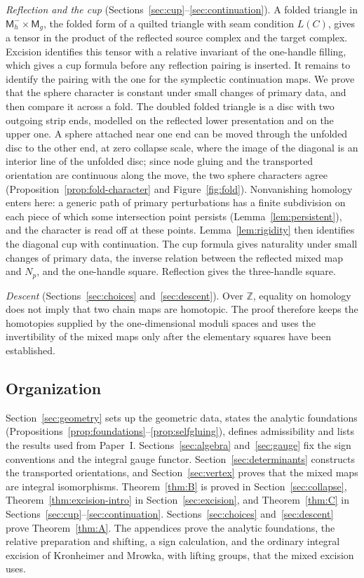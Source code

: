 \documentclass[11pt]{amsart}
\theoremstyle{definition}
\theoremstyle{remark}
\theoremstyle{plain}
\numberwithin{equation}{section}
\newcommand{\ZZ}{\mathbb Z}
\newcommand{\Msf}{\mathsf M}
\begin{document}
\emph{Reflection and the cup} (Sections~\ref{sec:cup}--\ref{sec:continuation}). A folded triangle
in $\Msf_h^-\times\Msf_g$, the folded form of a quilted triangle with seam condition $L(C)$, gives a
tensor in the product of the reflected source complex and the target complex. Excision identifies this tensor with a
relative invariant of the one-handle filling, which gives a cup formula before any reflection pairing is inserted. It remains
to identify the pairing with the one for the symplectic continuation maps. We prove that the sphere character is constant under small changes of primary data, and then compare it across a fold. The doubled folded triangle is a disc with two outgoing strip ends, modelled on the reflected lower presentation and on the upper one. A sphere attached near one end can be moved through the unfolded disc to the other end, at zero collapse scale, where the image of the diagonal is an interior line of the unfolded disc; since node gluing and the transported orientation are continuous along the move, the two sphere characters agree (Proposition~\ref{prop:fold-character} and Figure~\ref{fig:fold}).
Nonvanishing homology enters here: a generic path of primary perturbations has a finite subdivision
on each piece of which some intersection point persists (Lemma~\ref{lem:persistent}), and the
character is read off at these points. Lemma~\ref{lem:rigidity} then identifies the diagonal cup with
continuation. The cup formula gives naturality under small changes of primary data, the inverse
relation between the reflected mixed map and $N_p$, and the one-handle square. Reflection gives the
three-handle square.

\emph{Descent} (Sections~\ref{sec:choices} and~\ref{sec:descent}). Over $\ZZ$, equality on homology
does not imply that two chain maps are homotopic. The proof therefore keeps the homotopies supplied
by the one-dimensional moduli spaces and uses the invertibility of the mixed maps only after the
elementary squares have been established.

\subsection{Organization}
Section~\ref{sec:geometry} sets up the geometric data, states the analytic foundations
(Propositions~\ref{prop:foundations}--\ref{prop:selfgluing}), defines admissibility and lists the
results used from Paper~I. Sections~\ref{sec:algebra} and~\ref{sec:gauge} fix the sign conventions
and the integral gauge functor. Section~\ref{sec:determinants} constructs the transported
orientations, and Section~\ref{sec:vertex} proves that the mixed maps are integral isomorphisms.
Theorem~\ref{thm:B} is proved in Section~\ref{sec:collapse}, Theorem~\ref{thm:excision-intro} in
Section~\ref{sec:excision}, and Theorem~\ref{thm:C} in Sections~\ref{sec:cup}--\ref{sec:continuation}.
Sections~\ref{sec:choices} and~\ref{sec:descent} prove Theorem~\ref{thm:A}. The appendices prove the
analytic foundations, the relative preparation and shifting, a sign calculation, and the ordinary
integral excision of Kronheimer and Mrowka, with lifting groups, that the mixed excision uses.
\end{document}
